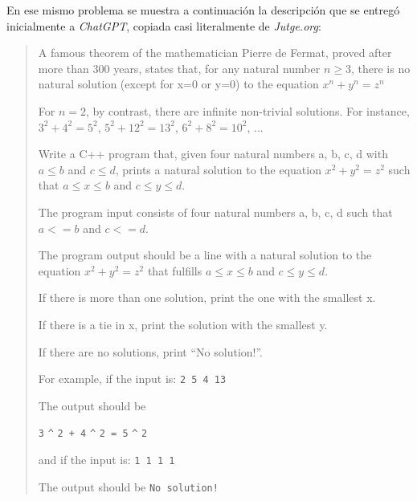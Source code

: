 \documentclass[twocolumn,twoside,a4paper, 10pt]{article}
\newcommand{\jutge}{\textit{Jutge.org}{}}           %
\newcommand{\ChatGPT}{\textit{ChatGPT}{}}           %
\begin{document}
En ese mismo problema se muestra a continuación la descripción que se entregó inicialmente
a \ChatGPT{}, copiada casi literalmente de \jutge{}:
\begin{quote}
A famous theorem of the mathematician Pierre de Fermat, proved after more than 300 years, 
states that, for any natural number $n \geq 3$, there is no natural solution (except for x=0 or y=0) to the equation
 $x^n + y^n = z^n$

For $n=2$, by contrast, there are infinite non-trivial solutions. 
For instance, $3^2 + 4^2 = 5^2$, $5^2 + 12^2 = 13^2$, $6^2 + 8^2 = 10^2$, ...

Write a C++ program that, given four natural numbers a, b, c, d with $a \leq b$ and $c \leq d$, prints a natural solution to the equation
  $x^2 + y^2 = z^2$
such that $a \leq x \leq b$ and $c \leq y \leq d$.

The program input consists of four natural numbers a, b, c, d such that $a<=b$ and $c<=d$.

The program output should be a line with a natural solution to the equation
  $x^2 + y^2 = z^2$
that fulfills $a \leq x \leq b$ and $c \leq y \leq d$. 

If there is more than one solution, print the one with the smallest x. 

If there is a tie in x, print the solution with the smallest y. 

If there are no solutions, print ``No solution!''.

For example, if the input is:
\texttt{2 5 4 13}

The output should be

\texttt{3} \texttt{\^} \texttt{2 + 4} \texttt{\^} \texttt{2 = 5} \texttt{\^} \texttt{2}

and if the input is:
\texttt{1 1 1 1}

     The output should be 
\texttt{No solution!}
\end{quote}
\end{document}
